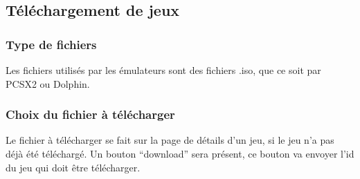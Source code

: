 \documentclass[a4paper,12pt,french]{sphinxmanual}
\begin{document}
\subsection{Téléchargement de jeux}
\label{\detokenize{organique:telechargement-de-jeux}}

\subsubsection{Type de fichiers}
\label{\detokenize{organique:type-de-fichiers}}
\sphinxAtStartPar
Les fichiers utilisés par les émulateurs sont des fichiers .iso, que ce soit par PCSX2 ou Dolphin.


\subsubsection{Choix du fichier à télécharger}
\label{\detokenize{organique:choix-du-fichier-a-telecharger}}
\sphinxAtStartPar
Le fichier à télécharger se fait sur la page de détails d’un jeu, si le jeu n’a pas déjà été téléchargé. Un bouton “download” sera présent, ce bouton va envoyer l’id du jeu qui doit être télécharger.

\begin{sphinxVerbatim}[commandchars=\\\{\}]
 
                           
                        
                        
                       
                    \PYG{p}{[}\PYG{p}{]}
                     
\end{sphinxVerbatim}
\end{document}
